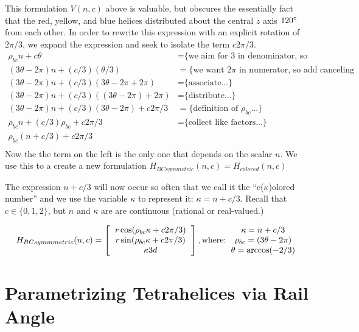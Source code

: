 \documentclass[11pt]{article}
\begin{document}
This formulation $V(n,c)$ above is valuable, but obscures the essentially fact that the red, yellow, and blue helices distributed
about the central $z$ axis $120\degree$ from each other.
In order to rewrite this expression with an explicit rotation of $2\pi/3$, we expand 
the expression and seek to isolate the term $c2\pi/3$.
\begin{align*}
  \rho_{bc} n + c \theta  &=   \text{\{we aim for 3 in denominator, so we split...\}} \\
    (3 \theta - 2 \pi)n + (c/3)  (\theta /3)  &=   \text{\{we want $2\pi$ in numerator, so add canceling terms...\}} \\
  (3 \theta - 2 \pi)n + (c/ 3) (3 \theta - 2 \pi  + 2 \pi) &=  \text{\{associate...\}} \\
  (3 \theta - 2 \pi)n + (c/ 3) ((3 \theta - 2 \pi)  + 2 \pi) &=  \text{\{distribute...\}} \\  
  (3 \theta - 2 \pi)n + (c / 3) (3 \theta - 2 \pi)  + c 2 \pi /3 &=  \text{\{definition of $\rho_{bc}$...\}} \\
  \rho_{bc} n + (c / 3) \rho_{bc}  + c 2 \pi /3 &=  \text{\{collect like factors...\}} \\  
  \rho_{bc} (n + c/3)  + c 2 \pi /3  \\
\end{align*}
Now the the term on the left is the only one that depends on the scalar $n$. We use this to a create
a new formulation $H_{BCsymmetric}(n,c) = H_{colored}(n,c)$

The expression $n+c/3$ will now occur so often that we call it the ``c($\kappa$)olored number'' and we use the variable $\kappa$ to represent it: $\kappa = n+c/3$.
Recall that $c \in \{0,1,2\}$, but $n$ and $\kappa$ are are continuous (rational or real-valued.)

\[
H_{BCsymmmetric}(n,c) =
\left [
  \begin{tabular}{c}
   $ r  \cos(\rho_{bc} \kappa  + c 2 \pi /3) $\\
   $ r  \sin(\rho_{bc} \kappa  + c 2 \pi /3) $\\
   $ \kappa 3  d $
  \end{tabular}
  \right ],
\text{where:}
  \begin{tabular}{c}
 $\kappa = n + c/3$ \\
    $\rho_{bc} = (3 \theta - 2 \pi)$ \\
   $ \theta = \arccos(-2/3) $
  \end{tabular}      
\]


\section{Parametrizing Tetrahelices via Rail Angle}
\end{document}
